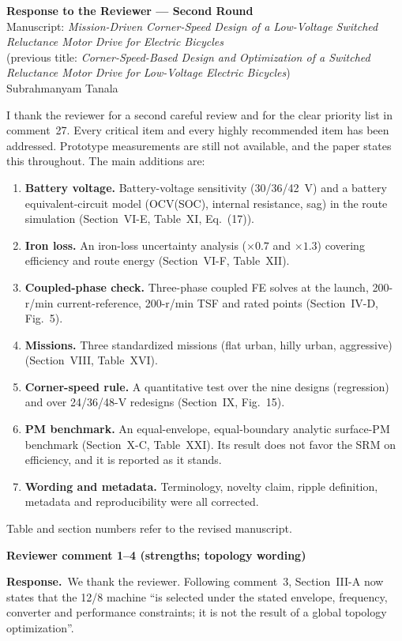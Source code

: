 \documentclass[10pt]{article}
\newcommand{\rev}[1]{\par\medskip\noindent\textbf{Reviewer comment #1}\par}
\newcommand{\resp}{\par\noindent\textcolor{blue!50!black}{\textbf{Response.}}~}
\begin{document}
\sloppy

\begin{center}
{\Large\bfseries Response to the Reviewer --- Second Round}\\[4pt]
Manuscript: \emph{Mission-Driven Corner-Speed Design of a Low-Voltage Switched Reluctance Motor Drive for Electric Bicycles}\\
(previous title: \emph{Corner-Speed-Based Design and Optimization of a Switched Reluctance Motor Drive for Low-Voltage Electric Bicycles})\\[2pt]
Subrahmanyam Tanala
\end{center}

I thank the reviewer for a second careful review and for the clear priority
list in comment~27. Every critical item and every highly recommended item has
been addressed. Prototype measurements are still not available, and the paper
states this throughout. The main additions are:
\begin{enumerate}[nosep]
\item \textbf{Battery voltage.} Battery-voltage sensitivity (30/36/42~V) and a
battery equivalent-circuit model (OCV(SOC), internal resistance, sag) in the
route simulation (Section~VI-E, Table~XI, Eq.~(17)).
\item \textbf{Iron loss.} An iron-loss uncertainty analysis ($\times0.7$ and
$\times1.3$) covering efficiency and route energy (Section~VI-F, Table~XII).
\item \textbf{Coupled-phase check.} Three-phase coupled FE solves at the launch,
200-r/min current-reference, 200-r/min TSF and rated points (Section~IV-D,
Fig.~5).
\item \textbf{Missions.} Three standardized missions (flat urban, hilly urban,
aggressive) (Section~VIII, Table~XVI).
\item \textbf{Corner-speed rule.} A quantitative test over the nine designs
(regression) and over 24/36/48-V redesigns (Section~IX, Fig.~15).
\item \textbf{PM benchmark.} An equal-envelope, equal-boundary analytic
surface-PM benchmark (Section~X-C, Table~XXI). Its result does not favor the
SRM on efficiency, and it is reported as it stands.
\item \textbf{Wording and metadata.} Terminology, novelty claim, ripple
definition, metadata and reproducibility were all corrected.
\end{enumerate}
Table and section numbers refer to the revised manuscript.

\rev{1--4 (strengths; topology wording)}
\resp We thank the reviewer. Following comment~3, Section~III-A now states that
the 12/8 machine ``is selected under the stated envelope, frequency, converter
and performance constraints; it is not the result of a global topology
optimization''.
\end{document}

